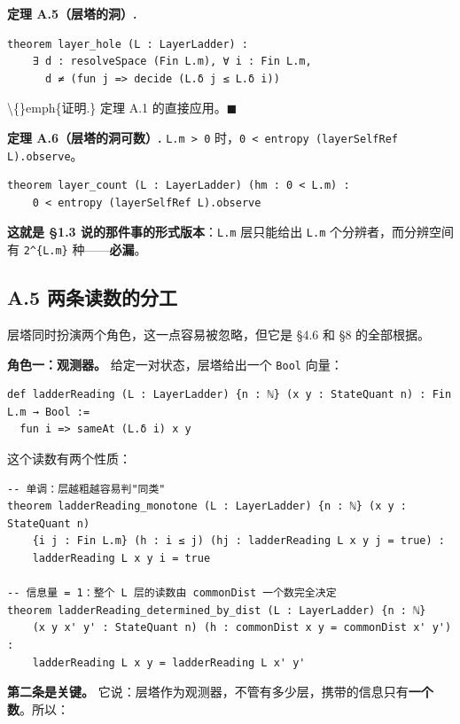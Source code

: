\documentclass[11pt,a4paper]{ctexart}
\begin{document}
\textbf{定理 A.5（层塔的洞）.}

\begin{lstlisting}
theorem layer_hole (L : LayerLadder) :
    ∃ d : resolveSpace (Fin L.m), ∀ i : Fin L.m,
      d ≠ (fun j => decide (L.δ j ≤ L.δ i))
\end{lstlisting}

\textbackslash\{\}emph\{证明.\} 定理 A.1 的直接应用。\ensuremath{\ensuremath{\blacksquare}}

\textbf{定理 A.6（层塔的洞可数）.} \texttt{L.m > 0} 时，\texttt{0 < entropy (layerSelfRef L).observe}。

\begin{lstlisting}
theorem layer_count (L : LayerLadder) (hm : 0 < L.m) :
    0 < entropy (layerSelfRef L).observe
\end{lstlisting}

\textbf{这就是 §1.3 说的那件事的形式版本}：\texttt{L.m} 层只能给出 \texttt{L.m} 个分辨者，而分辨空间有 \texttt{2\textasciicircum{}\{L.m\}} 种——\textbf{必漏}。

\subsection{A.5 两条读数的分工}

层塔同时扮演两个角色，这一点容易被忽略，但它是 §4.6 和 §8 的全部根据。

\textbf{角色一：观测器。} 给定一对状态，层塔给出一个 \texttt{Bool} 向量：

\begin{lstlisting}
def ladderReading (L : LayerLadder) {n : ℕ} (x y : StateQuant n) : Fin L.m → Bool :=
  fun i => sameAt (L.δ i) x y
\end{lstlisting}

这个读数有两个性质：

\begin{lstlisting}
-- 单调：层越粗越容易判"同类"
theorem ladderReading_monotone (L : LayerLadder) {n : ℕ} (x y : StateQuant n)
    {i j : Fin L.m} (h : i ≤ j) (hj : ladderReading L x y j = true) :
    ladderReading L x y i = true

-- 信息量 = 1：整个 L 层的读数由 commonDist 一个数完全决定
theorem ladderReading_determined_by_dist (L : LayerLadder) {n : ℕ}
    (x y x' y' : StateQuant n) (h : commonDist x y = commonDist x' y') :
    ladderReading L x y = ladderReading L x' y'
\end{lstlisting}

\textbf{第二条是关键。} 它说：层塔作为观测器，不管有多少层，携带的信息只有\textbf{一个数}。所以：
\end{document}
